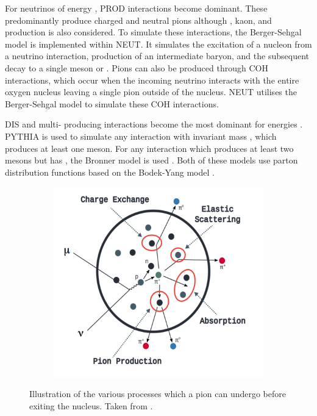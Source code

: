 For neutrinos of energy , PROD interactions become dominant. These predominantly produce charged and neutral pions although \quickmath{\gamma}, kaon, and \quickmath{\eta} production is also considered. To simulate these interactions, the Berger-Sehgal \cite{PhysRevD.76.113004} model is implemented within NEUT. It simulates the excitation of a nucleon from a neutrino interaction, production of an intermediate baryon, and the subsequent decay to a single meson or \quickmath{\gamma}. Pions can also be produced through COH interactions, which occur when the incoming neutrino interacts with the entire oxygen nucleus leaving a single pion outside of the nucleus. NEUT utilises the Berger-Sehgal \cite{Berger_Sehgal_coh} model to simulate these COH interactions.

DIS and multi-\quickmath{\pi} producing interactions become the most dominant for energies . PYTHIA \cite{Sjstrand1994} is used to simulate any interaction with invariant mass , which produces at least one meson. For any interaction which produces at least two mesons but has , the Bronner model is used \cite{Bronner2016}. Both of these models use parton distribution functions based on the Bodek-Yang model \cite{Gl_ck_1998,10.48550/arxiv.1011.6592,10.48550/arxiv.1012.0261}. 

\begin{figure}[h]
  \begin{subfigure}[t]{0.8\textwidth}
    \includegraphics[width=\textwidth, trim={0mm 0mm 0mm 0mm}, clip,page=1]{Figures/Simulations/FSIDiagram.pdf}
  \end{subfigure}
  \caption{Illustration of the various processes which a pion can undergo before exiting the nucleus. Taken from \cite{10.48550/arxiv.1602.05299}.}
  \label{fig:Simulations_FSIDiagram}
\end{figure}

